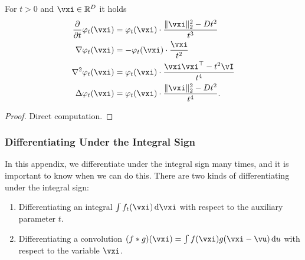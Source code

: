 \documentclass[../../book-main.tex]{subfiles}
\begin{document}
\begin{proposition}\label{prop:normal_derivatives}
    For \(t > 0\) and \(\vxi \in \R^{D}\) it holds 
    \begin{align}
        \pdv*{\phi_{t}}{t}(\vxi)
        &= \phi_{t}(\vxi) \cdot \frac{\norm{\vxi}_{2}^{2} - Dt^{2}}{t^{3}} \\
        \nabla \phi_{t}(\vxi)
        &= -\phi_{t}(\vxi)\cdot\frac{\vxi}{t^{2}} \\ 
        \nabla^{2} \phi_{t}(\vxi)
        &= \phi_{t}(\vxi)\cdot\frac{\vxi\vxi^{\top} - t^{2}\vI}{t^{4}} \\
        \Delta \phi_{t}(\vxi)
        &= \phi_{t}(\vxi) \cdot \frac{\norm{\vxi}_{2}^{2} - Dt^{2}}{t^{4}}.
    \end{align}
\end{proposition}
\begin{proof}
    Direct computation.
\end{proof}



\subsubsection{Differentiating Under the Integral Sign}

In this appendix, we differentiate under the integral sign many times, and it is important to know when we can do this. There are two kinds of differentiating under the integral sign:
\begin{enumerate}
    \item Differentiating an integral \(\int f_{t}(\vxi)\odif{\vxi}\) with respect to the auxiliary parameter \(t\).
    \item Differentiating a convolution \((f * g)(\vxi) = \int f(\vxi)g(\vxi - \vu)\odif{u}\) with respect to the variable \(\vxi\).
\end{enumerate}
\end{document}
